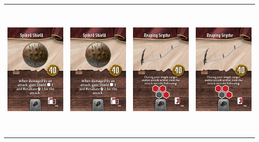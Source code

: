 \documentclass{minimal}
\begin{document}
{\begin{longtable}{llll}
\includegraphics[width=44mm,height=68mm]{./43-49/gh-046-spiked-shield.png} &
\includegraphics[width=44mm,height=68mm]{./43-49/gh-046-spiked-shield.png} &
\includegraphics[width=44mm,height=68mm]{./43-49/gh-047-reaping-scythe.png} &
\includegraphics[width=44mm,height=68mm]{./43-49/gh-047-reaping-scythe.png}\\ 

\end{longtable}}
\end{document}
